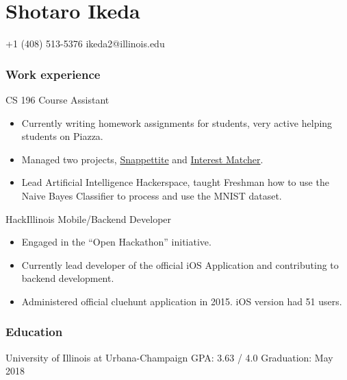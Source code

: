 \documentclass{tccv}
\begin{document}
\part{Shotaro Ikeda}

{+1 (408) 513-5376}
{ikeda2@illinois.edu}

\section{Work experience}

\begin{eventlist}

  {CS 196}
  {Course Assistant}

  \begin{itemize}
  \item Currently writing homework assignments for students, very active helping students on Piazza.
  \item Managed two projects, \href{https://github.com/SNAPPETITE}{Snappettite} and \href{https://github.com/InterestMatcher}{Interest Matcher}.
  \item Lead Artificial Intelligence Hackerspace, taught Freshman how to use the Naive Bayes Classifier to process and use the MNIST dataset.
  \end{itemize}

  {HackIllinois}
  {Mobile/Backend Developer}
  \begin{itemize}
  \item Engaged in the ``Open Hackathon'' initiative.
  \item Currently lead developer of the official iOS Application and contributing to \\
    backend development.
  \item Administered official cluehunt application in 2015. iOS version had 51 users.
  \end{itemize}

\end{eventlist}

\section{Education}

\begin{yearlist}

  {University of Illinois at  \newline Urbana-Champaign}
  {GPA: 3.63 / 4.0}
  {Graduation: May 2018}

\end{yearlist}
\end{document}
